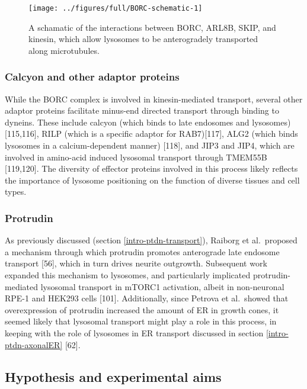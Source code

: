 \documentclass[
  12pt,
  a4paper,
]{book}
\begin{document}
\vspace{30pt}
\begin{figure}
\texttt{[image: ../figures/full/BORC-schematic-1]} \caption[BORC schematic]{A schamatic of the interactions between BORC, ARL8B, SKIP, and kinesin, which allow lysosomes to be anterogradely transported along microtubules.}\label{fig:BORC-schematic}
\end{figure}

\subsubsection{Calcyon and other adaptor proteins}\label{calcyon-and-other-adaptor-proteins}

While the BORC complex is involved in kinesin-mediated transport, several other adaptor proteins facilitate minus-end directed transport through binding to dyneins. These include calcyon (which binds to late endosomes and lysosomes) {[}115,116{]}, RILP (which is a specific adaptor for RAB7){[}117{]}, ALG2 (which binds lysosomes in a calcium-dependent manner) {[}118{]}, and JIP3 and JIP4, which are involved in amino-acid induced lysosomal transport through TMEM55B {[}119,120{]}. The diversity of effector proteins involved in this process likely reflects the importance of lysosome positioning on the function of diverse tissues and cell types.

\subsubsection{Protrudin}\label{protrudin}

As previously discussed (section \ref{intro-ptdn-transport}), Raiborg et al.~proposed a mechanism through which protrudin promotes anterograde late endosome transport {[}56{]}, which in turn drives neurite outgrowth. Subsequent work expanded this mechanism to lysosomes, and particularly implicated protrudin-mediated lysosomal transport in mTORC1 activation, albeit in non-neuronal RPE-1 and HEK293 cells {[}101{]}. Additionally, since Petrova et al.~showed that overexpression of protrudin increased the amount of ER in growth cones, it seemed likely that lysosomal transport might play a role in this process, in keeping with the role of lysosomes in ER transport discussed in section \ref{intro-ptdn-axonalER} {[}62{]}.

\subsection{Hypothesis and experimental aims}\label{hypothesis-and-experimental-aims}
\end{document}
